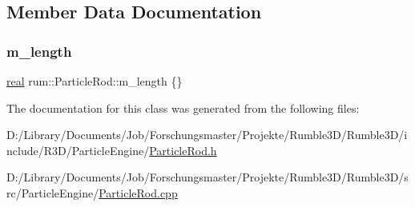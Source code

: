 \subsection{Member Data Documentation}
\mbox{\label{classrum_1_1_particle_rod_a9f5c266ef3a91afc3f3c41b7c0f300a9}} 
\subsubsection{\texorpdfstring{m\+\_\+length}{m\_length}}
{\footnotesize\ttfamily \mbox{\hyperlink{namespacerum_a7e8cca23573d5eaead0f138cbaa4862c}{real}} rum\+::\+Particle\+Rod\+::m\+\_\+length \{\}\hspace{0.3cm}{\ttfamily [protected]}}



The documentation for this class was generated from the following files\+:\begin{DoxyCompactItemize}
\item 
D\+:/\+Library/\+Documents/\+Job/\+Forschungsmaster/\+Projekte/\+Rumble3\+D/\+Rumble3\+D/include/\+R3\+D/\+Particle\+Engine/\mbox{\hyperlink{_particle_rod_8h}{Particle\+Rod.\+h}}\item 
D\+:/\+Library/\+Documents/\+Job/\+Forschungsmaster/\+Projekte/\+Rumble3\+D/\+Rumble3\+D/src/\+Particle\+Engine/\mbox{\hyperlink{_particle_rod_8cpp}{Particle\+Rod.\+cpp}}\end{DoxyCompactItemize}

